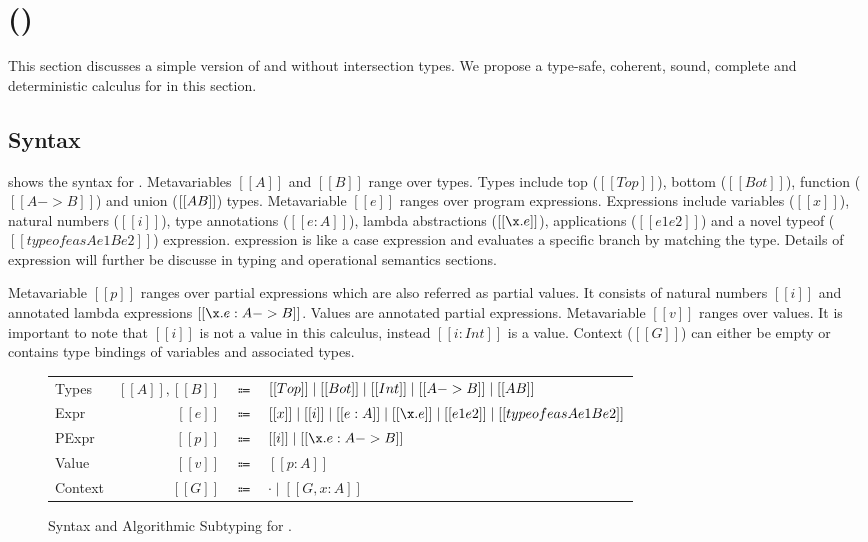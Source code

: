 \section{\name (\cal)}
\label{sec:union}

This section discusses a simple version of \name and without intersection types. We propose a type-safe,
coherent, sound, complete and deterministic calculus for \name in this section.


\subsection{Syntax}
\label{sec:union:syntax}
 shows the syntax for \cal. Metavariables $[[A]]$ and $[[B]]$ range over types.
Types include top ($[[Top]]$), bottom ($[[Bot]]$), function ($[[A -> B]]$) and union ($[[A \/ B]]$) types.
Metavariable $[[e]]$ ranges over program expressions. Expressions include variables ($[[x]]$), natural
numbers ($[[i]]$), type annotations ($[[e:A]]$), lambda abstractions ($[[\x.e]]$), applications 
($[[e1 e2]]$) and a novel typeof ($[[typeof e as A e1 B e2]]$) expression. \Typeof expression is 
like a case expression and evaluates a specific branch by matching the type. Details of \typeof 
expression will further be discusse in typing and operational semantics sections.

Metavariable $[[p]]$ ranges over partial expressions which are also referred as partial values.
It consists of natural numbers $[[i]]$ and annotated lambda expressions $[[\x.e : A -> B]]$.
Values are annotated partial expressions. Metavariable $[[v]]$ ranges over values. It is important to
note that $[[i]]$ is not a value in this calculus, instead $[[i:Int]]$ is a value.
Context ($[[G]]$) can either be empty or contains type bindings of variables and associated types. 

\begin{figure}[t]
  \begin{small}
    \centering
    \begin{tabular}{lrcl} \toprule
      Types & $[[A]], [[B]]$ & $\Coloneqq$ & $ [[Top]] \mid [[Bot]] \mid [[Int]] \mid [[A -> B]] \mid [[A \/ B]] $ \\
      Expr & $[[e]]$ & $\Coloneqq$ & $[[x]] \mid [[i]] \mid [[e:A]] \mid [[\x.e]] \mid [[e1 e2]] \mid [[typeof e as A e1 B e2]]$\\
      PExpr & $[[p]]$ & $\Coloneqq$ & $[[i]] \mid [[\x.e : A -> B]] $\\
      Value & $[[v]]$ & $\Coloneqq$ & $[[p:A]]$\\
      Context & $[[G]]$ & $\Coloneqq$ & $ \cdot \mid [[G , x : A]]$ \\
      \bottomrule
    \end{tabular}
  \end{small}
  \begin{small}
    \centering
  \end{small}
  \caption{Syntax and Algorithmic Subtyping for \cal.}
  \label{fig:union:syntax}
\end{figure}

